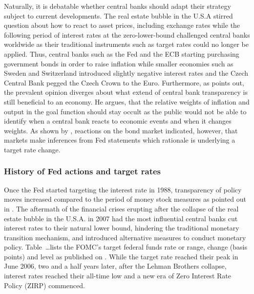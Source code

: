 Naturally, it is debatable whether central banks should adapt their strategy subject to current developments. The real estate bubble in the U.S.A stirred question about how to react to asset prices, including exchange rates while the following period of interest rates at the zero-lower-bound challenged central banks worldwide as their traditional instruments such as target rates could no longer be applied. Thus, central banks such as the Fed and the ECB starting purchasing government bonds in order to raise inflation while smaller economies such as Sweden and Switzerland introduced slightly negative interest rates and the Czech Central Bank pegged the Czech Crown to the Euro. Furthermore, as \textcite{Mishkin.2007} points out, the prevalent opinion diverges about what extend of central bank transparency is still beneficial to an economy. He argues, that the relative weights of inflation and output in the goal function should stay occult as the public would not be able to identify when a central bank reacts to economic events and when it changes weights. As shown by \textcite{Ellingsen.2001}, reactions on the bond market indicated, however, that markets make inferences from Fed statements which rationale is underlying a target rate change. %


\subsubsection{History of Fed actions and target rates}

Once the Fed started targeting the interest rate in 1988, transparency of policy moves increased compared to the period of money stock measures as pointed out in \textcite{Ellingsen.2003}. The aftermath of the financial crises erupting after the collapse of the real estate bubble in the U.S.A. in 2007 had the most influential central banks cut interest rates to their natural lower bound, hindering the traditional monetary transition mechanism, and introduced alternative measures to conduct monetary policy. Table~\dots lists the FOMC's target federal funds rate or range, change (basis points) and level as published on \textcite{Fed.OMOs}. While the target rate reached their peak in June 2006, two and a half years later, after the Lehman Brothers collapse, interest rates reached their all-time low and a new era of Zero Interest Rate Policy (ZIRP) commenced.

